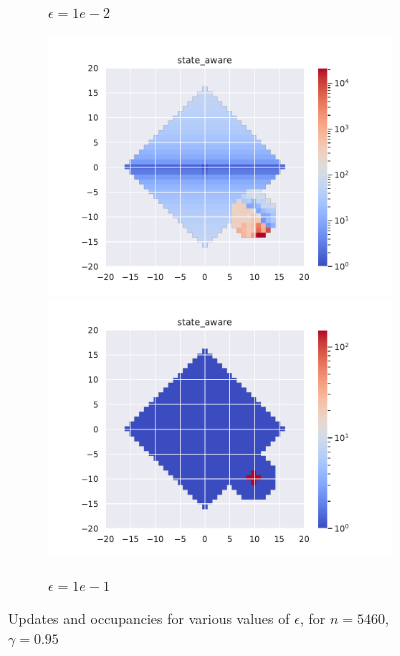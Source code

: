 \documentclass[runningheads]{llncs}
\begin{document}
\begin{figure}[H]
\begin{subfigure}[b]{\linewidth}
        \caption{$\epsilon=1e-2$}
    \end{subfigure}
    \begin{subfigure}[b]{\linewidth}
        \centering
        \includegraphics[width=0.49\linewidth]{img/epsilon/1e-1/updates_state_aware.pdf}
        \includegraphics[width=0.49\linewidth]{img/epsilon/1e-2/occupations_state_aware.pdf}
        \caption{$\epsilon=1e-1$}
    \end{subfigure}
    \caption{Updates and occupancies for various values of $\epsilon$, for $n = 5460$, $\gamma=0.95$}
    \label{fig:epsilon_1}
\end{figure}
\end{document}
